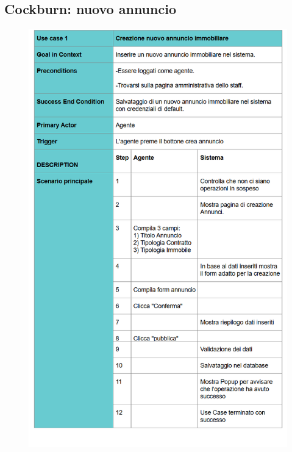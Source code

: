 \subsection{Cockburn: nuovo annuncio}

\begin{figure}[H]
	\centering
	\includegraphics[width=1\linewidth]{"Immagini/cockburn/nuovo annuncio principale.png"}
	\caption[CockBurn extensions: registra nuovo annuncio]{}
	\label{fig:registra-nuovo-annuncio-principale}
\end{figure}

\newpage

